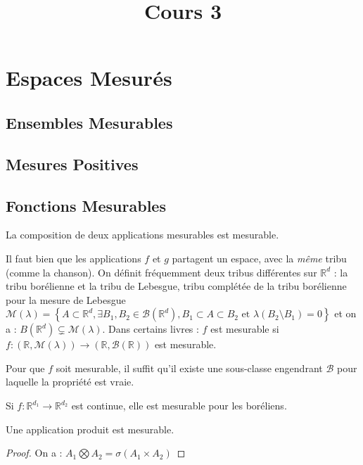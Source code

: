 \documentclass{cours}
\title{Cours 3}
\begin{document}
    \section{Espaces Mesurés}
    \subsection{Ensembles Mesurables}
    \subsection{Mesures Positives}
    \subsection{Fonctions Mesurables}
    \begin{theorem}
        La composition de deux applications mesurables est mesurable.
    \end{theorem}
    \begin{remark}
        Il faut bien que les applications $f$ et $g$ partagent un espace, avec la \emph{même} tribu (comme la chanson).
        On définit fréquemment deux tribus différentes sur $\mathbb{R}^{d}$ : la tribu borélienne et la tribu de Lebesgue, tribu complétée de la tribu borélienne pour la mesure de Lebesgue $\mathcal{M}(\lambda) = \left\{A \subset \mathbb{R}^{d}, \exists B_{1}, B_{2} \in \mathcal{B}(\mathbb{R}^{d}), B_1 \subset A \subset B_2 \text{ et } \lambda(B_2 \setminus B_1) = 0 \right\}$
        et on a : $B(\mathbb{R}^{d}) \subsetneq \mathcal{M}(\lambda)$. Dans certains livres : $f$ est mesurable si $f : \left(\mathbb{R}, \mathcal{M}(\lambda)\right) \rightarrow \left(\mathbb{R}, \mathcal{B}(\mathbb{R})\right)$ est mesurable.
    \end{remark}
    \begin{proposition}
        Pour que $f$ soit mesurable, il suffit qu'il existe une sous-classe engendrant $\mathcal{B}$ pour laquelle la propriété est vraie.
    \end{proposition}
    \begin{corollary}
        Si $f : \mathbb{R}^{d_1} \rightarrow\mathbb{R}^{d_2}$ est continue, elle est mesurable pour les boréliens.
    \end{corollary}
    \begin{corollary}
        Une application produit est mesurable.
    \end{corollary}
    \begin{proof}
        On a : $A_{1} \bigotimes A_{2} = \sigma\left(A_{1} \times A_{2}\right)$
    \end{proof}
\end{document}
